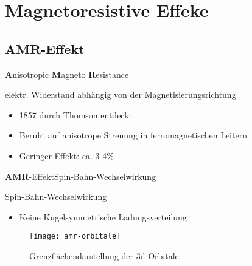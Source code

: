 \section{Magnetoresistive Effeke}

\subsection{AMR-Effekt}



\begin{frame}{\textbf{A}nisotropic \textbf{M}agneto \textbf{R}esistance}{}




	\begin{block}{elektr. Widerstand abhängig von der Magnetisierungsrichtung}
    	\centering
			\begin{itemize}
              \item 1857 durch Thomson entdeckt
              \item Beruht auf anisotrope Streuung in ferromagnetischen Leitern
              \item Geringer Effekt: ca. 3-4\%
			\end{itemize}
    \end{block}
\end{frame}

\begin{frame}{\textbf{A}\textbf{M}\textbf{R}-Effekt}{Spin-Bahn-Wechselwirkung}
	\begin{block}{Spin-Bahn-Wechselwirkung}
    	\centering
			\begin{itemize}
              \item Keine Kugelsymmetrische Ladungsverteilung
			\end{itemize}
    \end{block}
\begin{figure}[H]
	\begin{center}
		\texttt{[image: amr-orbitale]}
		\caption{Grenzflächendarstellung der 3d-Orbitale}
	\end{center}
\end{figure}
\end{frame}

